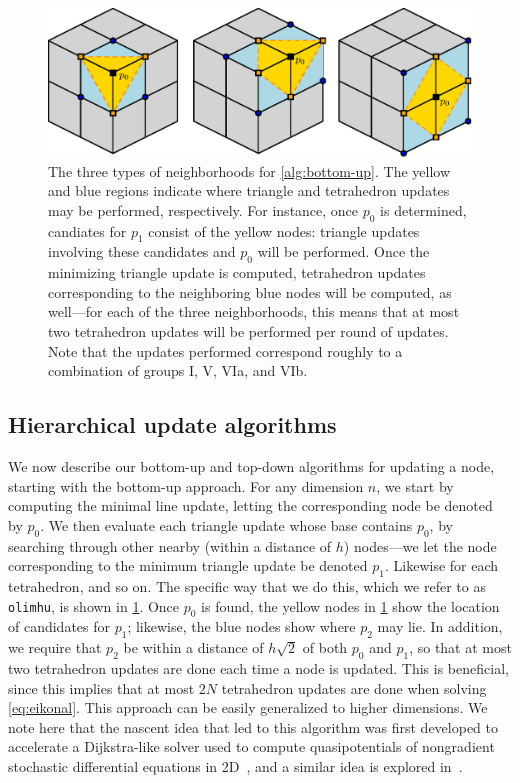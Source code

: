 \documentclass[eikonal.tex]{subfiles}
\begin{document}
\begin{figure}[t]
  \centering
  \includegraphics[width=0.85\linewidth]{hu-neighborhoods.eps}
  \caption{The three types of neighborhoods for
    \cref{alg:bottom-up}. The yellow and blue regions indicate where
    triangle and tetrahedron updates may be performed,
    respectively. For instance, once $p_0$ is determined, candiates
    for $p_1$ consist of the yellow nodes: triangle updates involving
    these candidates and $p_0$ will be performed. Once the minimizing
    triangle update is computed, tetrahedron updates corresponding to
    the neighboring blue nodes will be computed, as well---for each of
    the three neighborhoods, this means that at most two tetrahedron
    updates will be performed per round of updates. Note that the
    updates performed correspond roughly to a combination of groups I,
    V, VIa, and VIb.}\label{fig:hu-neighborhoods}
\end{figure}

\subsection[Update algorithms]{Hierarchical update algorithms}

We now describe our bottom-up and top-down algorithms for updating a
node, starting with the bottom-up approach. For any dimension $n$, we
start by computing the minimal line update, letting the corresponding
node be denoted by $p_0$. We then evaluate each triangle update whose
base contains $p_0$, by searching through other nearby (within a
distance of $h$) nodes---we let the node corresponding to the minimum
triangle update be denoted $p_1$. Likewise for each tetrahedron, and
so on. The specific way that we do this, which we refer to as
\texttt{olimhu}, is shown in \cref{fig:hu-neighborhoods}. Once $p_0$
is found, the yellow nodes in \cref{fig:hu-neighborhoods} show the
location of candidates for $p_1$; likewise, the blue nodes show where
$p_2$ may lie. In addition, we require that $p_2$ be within a distance
of $h \sqrt{2}$ of both $p_0$ and $p_1$, so that at most two
tetrahedron updates are done each time a node is updated. This is
beneficial, since this implies that at most $2N$ tetrahedron updates
are done when solving \cref{eq:eikonal}. This approach can be easily
generalized to higher dimensions. We note here that the nascent idea
that led to this algorithm was first developed to accelerate a
Dijkstra-like solver used to compute quasipotentials of nongradient
stochastic differential equations in 2D~\cite{dahiya2017ordered}, and
a similar idea is explored in~\cite{yang2018computing}.
\end{document}
